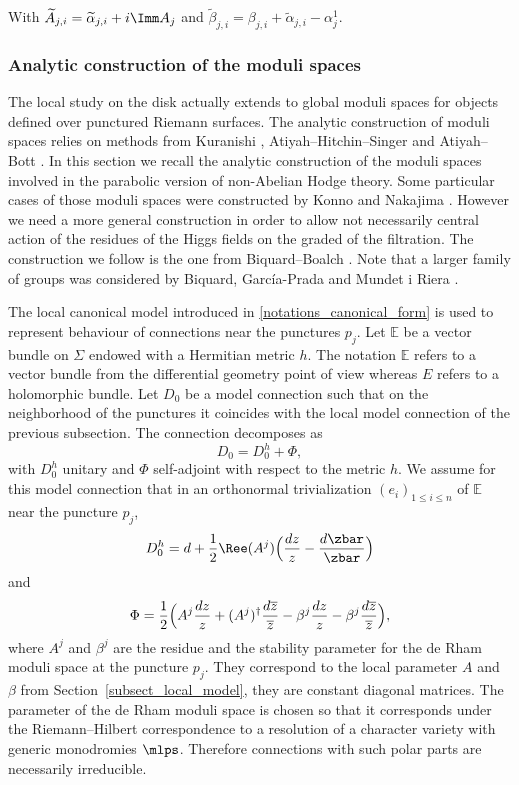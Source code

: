 With $\widetilde{A}_{j,i}= \widetilde{\alpha}_{j,i}+ i \Imm A_j$ and $\widetilde{\beta}_{j,i}=\beta_{j,i}+\widetilde{\alpha}_{j,i}-\alpha^1_j$.

\label{sect_diffeo_ms}
\subsubsection{Analytic construction of the moduli spaces}\label{sect_global_moduli}
The local study on the disk actually extends to global moduli spaces for objects defined over punctured Riemann surfaces. The analytic construction of moduli spaces relies on methods from Kuranishi \cite{Kuranishi}, Atiyah--Hitchin--Singer \cite{Atiyah_Hitchin_Singer} and Atiyah--Bott \cite{Atiyah_Bott}. In this section we recall the analytic construction of the moduli spaces involved in the parabolic version of non-Abelian Hodge theory. Some particular cases of those moduli spaces were constructed by Konno \cite{Konno} and Nakajima \cite{Nakajima_1996}. However we need a more general construction in order to allow not necessarily central action of the residues of the Higgs fields on the graded of the filtration. The construction we follow is the one from Biquard--Boalch \cite{Biquard_Boalch_2004}. Note that a larger family of groups was considered by Biquard, García-Prada and Mundet i Riera \cite{Biquard_Garcia_Prada_Riera}.

The local canonical model introduced in \ref{notations_canonical_form} is used to represent behaviour of connections near the punctures $p_j$. Let $\mathbb{E}$ be a vector bundle on $\Sigma$ endowed with a Hermitian metric $h$. The notation $\mathbb{E}$ refers to a vector bundle from the differential geometry point of view whereas $E$ refers to a holomorphic bundle. Let $D_0$ be a model connection such that on the neighborhood of the punctures it coincides with the local model connection of the previous subsection. The connection decomposes as
\[
D_0 = D_0^h + \Phi,
\]
with $D_0^h$ unitary and $\Phi$ self-adjoint with respect to the metric $h$. We assume for this model connection that in an orthonormal trivialization $(e_i)_{1\le i \le n}$ of $\mathbb{E}$ near the puncture $p_j$,
\[
D^h_0 = d + \frac{1}{2} \Ree(A^j) \Bigl(\frac{d z}{z} - \frac{d \zbar}{\zbar}\Bigr)
\]
and
\[
\Phi = \frac{1}{2} \Bigl(A^j\frac{d z}{z} + (A^j)^{\dagger}\frac{d\overline{z}}{\overline{z}} - \beta^j \frac{d z}{z} - \beta^j \frac{d \overline{z}}{\overline{z}}\Bigr),
\]
where $A^j$ and $\beta^j$ are the residue and the stability parameter for the de Rham moduli space at the puncture $p_j$. They correspond to the local parameter $A$ and $\beta$ from Section~\ref{subsect_local_model}, they are constant diagonal matrices. The parameter of the de Rham moduli space is chosen so that it corresponds under the Riemann--Hilbert correspondence to a resolution of a character variety with generic monodromies $\mlps$. Therefore connections with such polar parts are necessarily irreducible.

